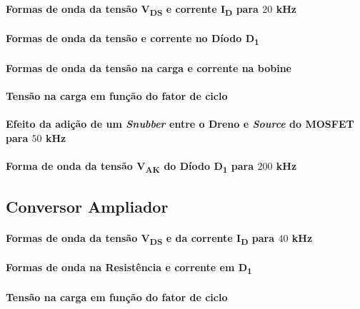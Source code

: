 \documentclass[a4paper,11pt]{article}
\numberwithin{equation}{section}
\begin{document}
\paragraph{Formas de onda da tensão V\textsubscript{DS} e corrente I\textsubscript{D} para $20$ kHz}

\paragraph{Formas de onda da tensão e corrente no Díodo D\textsubscript{1}}

\paragraph{Formas de onda da tensão na carga e corrente na bobine}

\paragraph{Tensão na carga em função do fator de ciclo}

\paragraph{Efeito da adição de um \textit{Snubber} entre o Dreno e \textit{Source} do MOSFET para $50$ kHz}

\paragraph{Forma de onda da tensão V\textsubscript{AK} do Díodo D\textsubscript{1} para $200$ kHz}

\subsection{Conversor Ampliador}

\paragraph{Formas de onda da tensão V\textsubscript{DS} e da corrente I\textsubscript{D} para $40$ kHz}

\paragraph{Formas de onda na Resistência e corrente em D\textsubscript{1}}

\paragraph{Tensão na carga em função do fator de ciclo}
\end{document}
